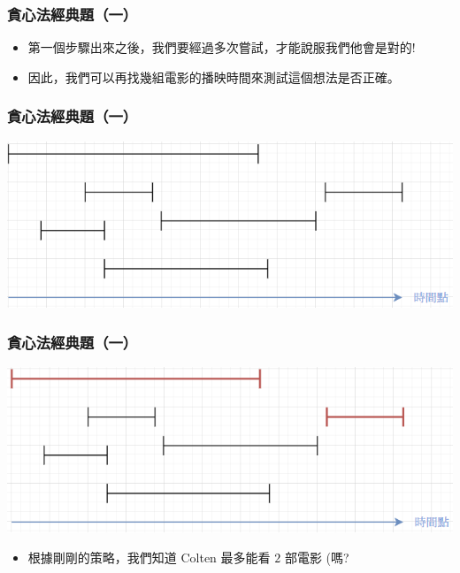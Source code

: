 \documentclass[aspectratio=169]{beamer}
\begin{document}
\begin{frame}
\frametitle{貪心法經典題（一）}
    \begin{itemize}
    \item<1-> 第一個步驟出來之後，我們要經過多次嘗試，才能說服我們他會是對的!
    \item<2-> 因此，我們可以再找幾組電影的播映時間來測試這個想法是否正確。
    \end{itemize}
\end{frame}

\begin{frame}
\frametitle{貪心法經典題（一）}
    \begin{center}
        \includegraphics[scale=0.75]{images/movie_festival_3.png}
    \end{center}
\end{frame}

\begin{frame}
\frametitle{貪心法經典題（一）}
    \begin{center}
        \includegraphics[scale=0.75]{images/movie_festival_4.png}
    \end{center}
    
    \begin{itemize}
    \item<1-> 根據剛剛的策略，我們知道 Colten 最多能看 $2$ 部電影 (嗎? 
    \end{itemize}
\end{frame}
\end{document}
